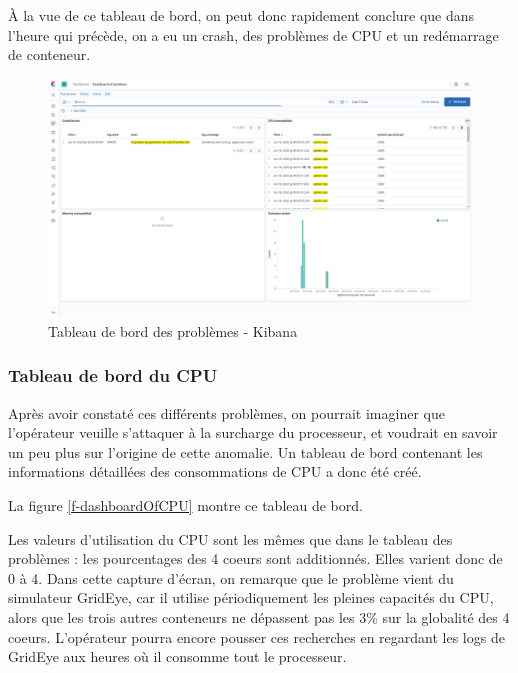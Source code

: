 \documentclass[paper=a4, fontsize=11pt]{scrartcl}
\begin{document}
À la vue de ce tableau de bord, on peut donc rapidement conclure que dans l'heure qui précède, on a eu un crash, des problèmes de CPU et un redémarrage de conteneur.

\begin{figure}[H]
    \centering
    \includegraphics[width=18cm]{img/screenshots/dashboardOfProblems.png}
    \caption{Tableau de bord des problèmes - Kibana}
    \label{f-dashboardOfProblems}
\end{figure}

\subsubsection{Tableau de bord du CPU} \label{sss-tableauDeBordDuCPU}

Après avoir constaté ces différents problèmes, on pourrait imaginer que l'opérateur veuille s'attaquer à la surcharge du processeur, et voudrait en savoir un peu plus sur l'origine de cette anomalie. Un tableau de bord contenant les informations détaillées des consommations de CPU a donc été créé.

La figure \ref{f-dashboardOfCPU} montre ce tableau de bord.

Les valeurs d'utilisation du CPU sont les mêmes que dans le tableau des problèmes : les pourcentages des 4 coeurs sont additionnés. Elles varient donc de 0 à 4. Dans cette capture d'écran, on remarque que le problème vient du simulateur GridEye, car il utilise périodiquement les pleines capacités du CPU, alors que les trois autres conteneurs ne dépassent pas les 3\% sur la globalité des 4 coeurs. L'opérateur pourra encore pousser ces recherches en regardant les logs de GridEye aux heures où il consomme tout le processeur.
\end{document}
